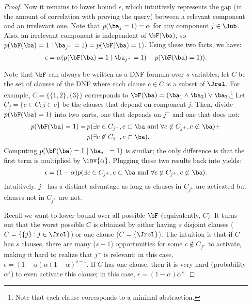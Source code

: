 \begin{proof}
Now it remains to lower bound $\epsilon$, which intuitively represents the gap
(in the amount of correlation with proving the query) between a relevant
component and an irrelevant one.
Note that $p(\ba_j = 1) = \alpha$ for any component $j \in \Jub$.
Also, an irrelevant component is independent of $\bF(\ba)$, so $p(\bF(\ba) = 1 \mid \ba_{j^-} = 1) = p(\bF(\ba) = 1)$.
Using these two facts, we have:
\begin{align}
\label{eqn:epsilon}
\epsilon = \alpha (p(\bF(\ba) = 1 \mid \ba_{j^+} = 1) - p(\bF(\ba) = 1)).
\end{align}

Note that $\bF$ can always be written as a DNF formula over $s$ variables;
let $C$ be the set of clauses of the DNF where each clause $c \in C$ is a subset of $\Jrel$.
For example, $C = \{ \{ 1,2 \}, \{ 3 \} \}$ corresponds to $\bF(\ba) = (\ba_1
\wedge \ba_2) \vee \ba_3$.\footnote{Note that each clause corresponds to a
minimal abstraction.}
Let $C_j = \{ c \in C : j \in c \}$ be the clauses that depend on component $j$.
Then, divide $p(\bF(\ba) = 1)$ into two parts,
one that depends on $j^+$ and one that does not:
\begin{align}
p(\bF(\ba) = 1) = & \, p(\exists c \in C_{j^+}, c \subset \ba \text{ and } \forall c \not\in C_{j^+}, c \not\subset \ba) + \nonumber \\
                  & \, p(\exists c \not\in C_{j^+}, c \subset \ba).
\end{align}
Computing $p(\bF(\ba) = 1 \mid \ba_{j^+} = 1)$ is similar; the only difference is that
the first term is multiplied by $\inv{\alpha}$.
Plugging these two results back into  yields:
\begin{align}
\label{eqn:epsilonFinal}
\epsilon = (1 - \alpha) p(\exists c \in C_{j^+}, c \subset \ba \text{ and } \forall c \not\in C_{j^+}, c \not\subset \ba).
\end{align}
Intuitively, $j^+$ has a distinct advantage as long as clauses in $C_{j^+}$
are activated but clauses not in $C_{j^+}$ are not.

Recall we want to lower bound  over all possible $\bF$ (equivalently, $C$).
It turns out that the worst possible $C$ is obtained by either having $s$
disjoint clauses ($C = \{ \{ j \} : j \in \Jrel \}$) or one clause ($C = \{ \Jrel \}$).
The intuition is that
if $C$ has $s$ clauses, there are many ($s-1$) opportunities for some $c \not\in C_{j^+}$ to activate,
making it hard to realize that $j^+$ is relevant;
in this case, $\epsilon = (1-\alpha) \alpha (1-\alpha)^{s-1}$.
If $C$ has one clause, then it is very hard (probability $\alpha^s$) to even activate this clause;
in this case, $\epsilon = (1-\alpha) \alpha^s$.


\end{proof}
